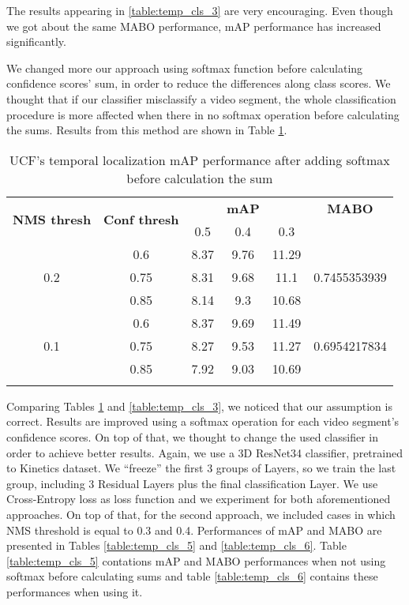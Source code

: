 \begin{center}

The results appearing in \ref{table:temp_cls_3} are very encouraging. Even though we got about the same MABO performance, mAP performance has increased significantly.  \par
We changed more our approach using softmax function before calculating confidence scores' sum, in order to reduce the differences along class scores. We thought that if
our classifier misclassify a video segment, the whole classification procedure is more affected when there in no softmax operation before calculating the sums. Results from this
method are shown in Table \ref{table:temp_cls_4}.


  \setlength{\tabcolsep}{2pt}
  \begin{longtable}{|| c | c || c c c | c ||}

    \hline
    \multirow{2}{*}{\textbf{NMS thresh}} & \multirow{2}{*}{\textbf{Conf thresh}} & {} & \textbf{mAP} & {} & \textbf{MABO} \\
    {} & {} & 0.5 & 0.4 & 0.3 & {}\\
    \hline
    \multirow{3}{*}{0.2} & 0.6 & 8.37 & 9.76 & 11.29  & \multirow{3}{*}{0.7455353939}\\
    \cline{2-5}
    {} & 0.75 &  8.31 & 9.68 & 11.1 & {} \\
    \cline{2-5}
    {} & 0.85 & 8.14 & 9.3 & 10.68  & {}\\
    \hline
    \multirow{3}{*}{0.1} & 0.6 & 8.37 & 9.69 & 11.49  & \multirow{3}{*}{0.6954217834}\\
    \cline{2-5}
    {} & 0.75 & 8.27 & 9.53 & 11.27  & {}\\
    \cline{2-5}
    {} & 0.85 & 7.92 & 9.03 & 10.69 & {}\\
    \hline

    \caption{UCF's temporal localization mAP performance after adding softmax before calculation the sum}
    \label{table:temp_cls_4}
  \end{longtable}
\end{center}


Comparing Tables \ref{table:temp_cls_4} and \ref{table:temp_cls_3}, we noticed that our assumption is  correct. Results are improved using a softmax operation for each video segment's confidence
scores. On top of that, we thought to change the used classifier in order to achieve better results.
Again, we use  a 3D ResNet34 classifier, pretrained to Kinetics dataset. We ``freeze'' the first 3 groups of Layers, so we train the last group, including 3 Residual Layers
plus the final classification Layer. We use Cross-Entropy loss as loss function and we experiment for both aforementioned approaches. On top  of that, for the second approach, we included
cases in which NMS threshold is equal to 0.3 and 0.4. Performances of mAP and MABO are
presented in Tables \ref{table:temp_cls_5} and \ref{table:temp_cls_6}. Table \ref{table:temp_cls_5} contations mAP and MABO performances when not using softmax before calculating sums and
table \ref{table:temp_cls_6} contains these performances when using it. 

